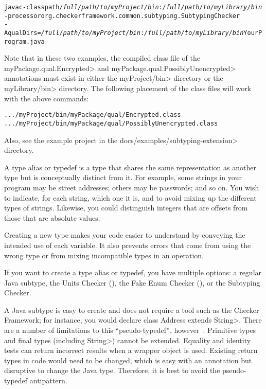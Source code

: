 \begin{enumerate}
\begin{alltt}
  javac -classpath \textit{/full/path/to/myProject/bin}:\textit{/full/path/to/myLibrary/bin} \ttbs
        -processor org.checkerframework.common.subtyping.SubtypingChecker \ttbs
        -AqualDirs=\textit{/full/path/to/myProject/bin}:\textit{/full/path/to/myLibrary/bin} YourProgram.java
\end{alltt}

\begin{sloppypar}
Note that in these two examples, the compiled class file of the
\<myPackage.qual.Encrypted> and \<myPackage.qual.PossiblyUnencrypted> annotations
must exist in either the \<myProject/bin> directory or the \<myLibrary/bin>
directory. The following placement of the class files will work with the above
commands:
\end{sloppypar}

\begin{alltt}
  .../myProject/bin/myPackage/qual/Encrypted.class
  .../myProject/bin/myPackage/qual/PossiblyUnencrypted.class
\end{alltt}

\end{enumerate}

Also, see the example project in the \<docs/examples/subtyping-extension> directory.



A type alias or typedef is a type that shares the same representation as
another type but is conceptually distinct from it.  For example, some
strings in your program may be street addresses; others may be passwords;
and so on.  You wish to indicate, for each string, which one it is, and to
avoid mixing up the different types of strings.  Likewise, you could
distinguish integers that are offsets from those that are absolute values.

Creating a new type makes your code easier to understand by conveying the
intended use of each variable.  It also prevents errors that come from
using the wrong type or from mixing incompatible types in an operation.

If you want to create a type alias or typedef, you have multiple options:
a regular Java subtype,
the Units Checker (),
the Fake Enum Checker (), or
the Subtyping Checker.

A Java subtype is easy to create and does not require a tool such as the
Checker Framework; for instance, you would declare \<class Address extends
String>.  There are a number of limitations to this ``pseudo-typedef'',
however~\cite{Goetz2006:typedef}.
Primitive types and final types (including \<String>) cannot be extended.
Equality and identity tests can return incorrect results when a wrapper
object is used.  Existing return types in code would need to be changed,
which is easy with an annotation but disruptive to change the Java type.
Therefore, it is best to avoid the pseudo-typedef antipattern.

